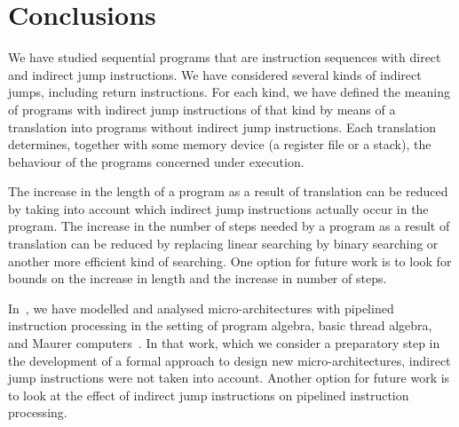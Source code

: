 \documentclass[fleqn]{llncs}
\begin{document}
\section{Conclusions}
\label{sect-concl}

We have studied sequential programs that are instruction sequences with
direct and indirect jump instructions.
We have considered several kinds of indirect jumps, including return
instructions.
For each kind, we have defined the meaning of programs with indirect
jump instructions of that kind by means of a translation into programs
without indirect jump instructions.
Each translation determines, together with some memory device
(a register file or a stack), the behaviour of the programs concerned
under execution.

The increase in the length of a program as a result of translation can
be reduced by taking into account which indirect jump instructions
actually occur in the program.
The increase in the number of steps needed by a program as a result of
translation can be reduced by replacing linear searching by binary
searching or another more efficient kind of searching.
One option for future work is to look for bounds on the increase in
length and the increase in number of steps.

In~\cite{BM06b}, we have modelled and analysed micro-architectures with
pipe\-lined instruction processing in the setting of program algebra,
basic thread algebra, and Maurer computers~\cite{Mau66a,Mau06a}.
In that work, which we consider a preparatory step in the development of
a formal approach to design new micro-architectures, indirect jump
instructions were not taken into account.
Another option for future work is to look at the effect of indirect jump
instructions on pipelined instruction processing.



\end{document}
